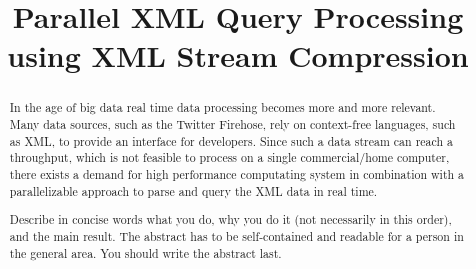 \documentclass[letterpaper]{article}
\title{Parallel XML Query Processing using XML Stream Compression}
\begin{document}
%
\maketitle
%

\begin{abstract}
In the age of big data real time data processing becomes more and more
relevant. Many data sources, such as the Twitter Firehose, rely on context-free
languages, such as XML, to provide an interface for developers. Since such a 
data stream can reach a throughput, which is not feasible to process
on a single commercial/home computer, there exists a demand for high performance 
computating system in combination with a parallelizable approach to parse and query
the XML data in real time. 

Describe in concise words what you do, why you do it (not necessarily
in this order), and the main result.  The abstract has to be
self-contained and readable for a person in the general area. You
should write the abstract last.
\end{abstract}
















\end{document}
